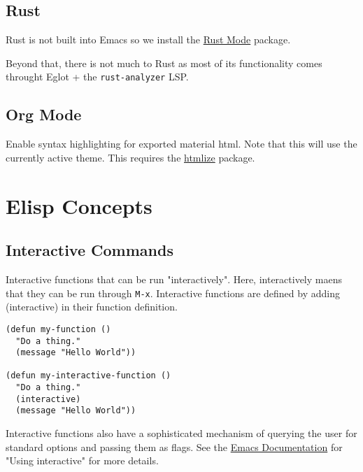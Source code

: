\documentclass[11pt]{article}
\begin{document}
\subsection{Rust}
\label{sec:org360e886}

Rust is not built into Emacs so we install the \href{https://github.com/rust-lang/rust-mode/tree/25d91cff281909e9b7cb84e31211c4e7b0480f94}{Rust Mode} package.

Beyond that, there is not much to Rust as most of its functionality comes
throught Eglot + the \texttt{rust-analyzer} LSP.
\subsection{Org Mode}
\label{sec:org01ea400}

Enable syntax highlighting for exported material html. Note that this will use
the currently active theme. This requires the \href{https://elpa.nongnu.org/nongnu/htmlize.html}{htmlize} package.
\section{Elisp Concepts}
\label{sec:org21d47eb}

\subsection{Interactive Commands}
\label{sec:orgdc8e759}

Interactive functions that can be run "interactively". Here, interactively maens
that they can be run through \texttt{M-x}. Interactive functions are defined by adding
(interactive) in their function definition.

\begin{verbatim}
(defun my-function ()
  "Do a thing."
  (message "Hello World"))

(defun my-interactive-function ()
  "Do a thing."
  (interactive)
  (message "Hello World"))
\end{verbatim}

Interactive functions also have a sophisticated mechanism of querying the user
for standard options and passing them as flags. See the \href{https://www.gnu.org/software/emacs/manual/html\_node/elisp/Using-Interactive.html}{Emacs Documentation} for
"Using interactive" for more details.
\end{document}
